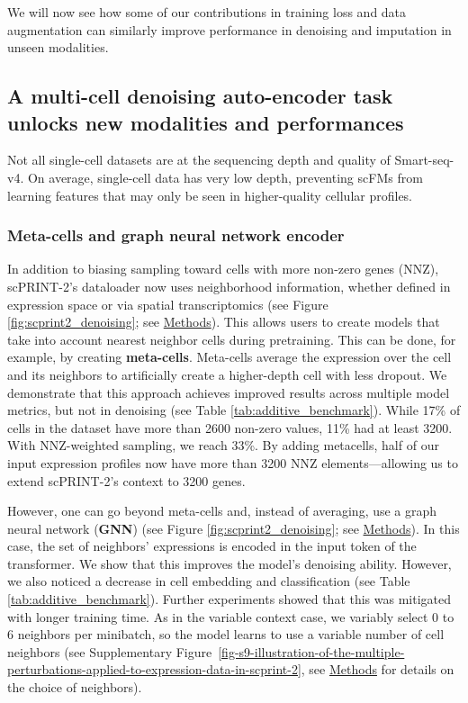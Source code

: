 We will now see how some of our contributions in training loss and data
augmentation can similarly improve performance in denoising and
imputation in unseen modalities.

\subsection{A multi-cell denoising auto-encoder task unlocks new
modalities and
performances}\label{a-multi-cell-denoising-auto-encoder-task-unlocks-new-modalities-and-performances}

Not all single-cell datasets are at the sequencing depth and quality of
Smart-seq-v4. On average, single-cell data has very low depth,
preventing \gls{scFM}s from learning features that may only be seen in
higher-quality cellular profiles.

\subsubsection{Meta-cells and graph neural network
encoder}\label{meta-cells-and-graph-neural-network-encoder}

In addition to biasing sampling toward cells with more non-zero genes
(\gls{NNZ}), \gls{scPRINT}-2's dataloader now uses neighborhood information, whether
defined in expression space or via spatial transcriptomics (see Figure
\ref{fig:scprint2_denoising}; see \hyperref[multi-cell-sampling]{Methods}). This allows users
to create models that take into account nearest neighbor cells during
pretraining. This can be done, for example, by creating
\textbf{meta-cells}. Meta-cells average the expression over the cell and
its neighbors to artificially create a higher-depth cell with less
dropout. We demonstrate that this approach achieves improved results
across multiple model metrics, but not in denoising (see Table \ref{tab:additive_benchmark}). While
17\% of cells in the dataset have more than 2600 non-zero values, 11\%
had at least 3200. With \gls{NNZ}-weighted sampling, we reach 33\%. By adding
metacells, half of our input expression profiles now have more than 3200
\gls{NNZ} elements---allowing us to extend \gls{scPRINT}-2's context to 3200 genes.

However, one can go beyond meta-cells and, instead of averaging, use a
graph neural network (\textbf{GNN}) (see Figure \ref{fig:scprint2_denoising}; see
\hyperref[gnn-expression-encoder]{Methods})\citep{zaheerDeepSets2018,corsoGraphNeuralNetworks2024}.
In this case, the set of neighbors' expressions is encoded in the input
token of the transformer. We show that this improves the model's
denoising ability. However, we also noticed a decrease in cell embedding
and classification (see Table \ref{tab:additive_benchmark}). Further experiments showed that this
was mitigated with longer training time. As in the variable context
case, we variably select 0 to 6 neighbors per minibatch, so the model
learns to use a variable number of cell neighbors (see Supplementary Figure~\ref{fig-s9-illustration-of-the-multiple-perturbations-applied-to-expression-data-in-scprint-2},
see \hyperref[multi-cell-sampling]{Methods} for details on the
choice of neighbors).

